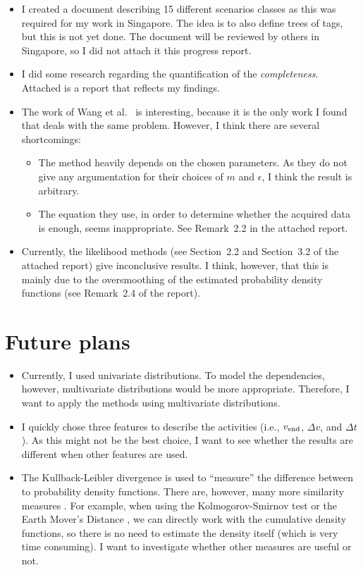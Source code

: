 \documentclass[10pt,final,a4paper,oneside,onecolumn]{article}
\begin{document}
\begin{itemize}
	\item I created a document describing 15 different scenarios classes as this was required for my work in Singapore. The idea is to also define trees of tags, but this is not yet done. The document will be reviewed by others in Singapore, so I did not attach it this progress report.
	\item I did some research regarding the quantification of the \emph{completeness}. Attached is a report that reflects my findings.
	\item The work of Wang et al.\ \cite{wang2017much} is interesting, because it is the only work I found that deals with the same problem. However, I think there are several shortcomings:
	\begin{itemize}
		\item The method heavily depends on the chosen parameters. As they do not give any argumentation for their choices of $m$ and $\epsilon$, I think the result is arbitrary. 
		\item The equation they use, in order to determine whether the acquired data is enough, seems inappropriate. See Remark~2.2 in the attached report.
	\end{itemize}
	\item Currently, the likelihood methods (see Section~2.2 and Section~3.2 of the attached report) give inconclusive results. I think, however, that this is mainly due to the oversmoothing of the estimated probability density functions (see Remark~2.4 of the report).
\end{itemize}

\section{Future plans}

\begin{itemize}
	\item Currently, I used univariate distributions. To model the dependencies, however, multivariate distributions would be more appropriate. Therefore, I want to apply the methods using multivariate distributions.
	\item I quickly chose three features to describe the activities (i.e., $v_{\textup{end}}$, $\Delta v$, and $\Delta t$). As this might not be the best choice, I want to see whether the results are different when other features are used.
	\item The Kullback-Leibler divergence \cite{kullback1951} is used to ``measure'' the difference between to probability density functions. There are, however, many more similarity measures \cite{cha2007surveyPDFmeasures}. For example, when using the Kolmogorov-Smirnov test or the Earth Mover's Distance \cite{cha2007surveyPDFmeasures}, we can directly work with the cumulative density functions, so there is no need to estimate the density itself (which is very time consuming). I want to investigate whether other measures are useful or not.
\end{itemize}
\end{document}
